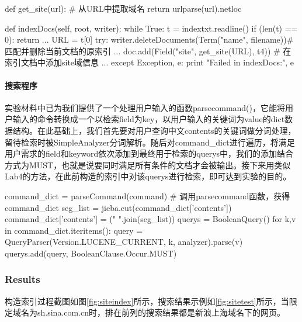 \documentclass{article}
\begin{document}
\begin{python}
def get_site(url):                                        # 从URL中提取域名
    return urlparse(url).netloc

def indexDocs(self, root, writer):
    while True:
        t = indextxt.readline()
        if (len(t) == 0):
            return
        ...
        URL = t[0]
        try:
            writer.deleteDocuments(Term("name", filename))# 匹配并删除当前文档的原索引
            ...
            doc.add(Field("site", get_site(URL), t4))     # 在索引文档中添加site域信息
            ...
        except Exception, e:
            print "Failed in indexDocs:", e
\end{python}

\paragraph{搜索程序}
实验材料中已为我们提供了一个处理用户输入的函数parsecommand()，它能将用户输入的命令转换成一个以检索field为key，以用户输入的关键词为value的dict数据结构。在此基础上，我们首先要对用户查询中文contents的关键词做分词处理，留待检索时被SimpleAnalyzer分词解析。随后对command\_dict进行遍历，将满足用户需求的field和keyword依次添加到最终用于检索的querys中，我们的添加结合方式为MUST，也就是说要同时满足所有条件的文档才会被输出。接下来用类似Lab4的方法，在此前构造的索引中对该querys进行检索，即可达到实验的目的。

\begin{python}
command_dict = parseCommand(command)                # 调用parsecommand函数，获得command_dict
seg_list = jieba.cut(command_dict['contents'])
command_dict['contents'] = (" ".join(seg_list))
querys = BooleanQuery()
for k,v in command_dict.iteritems():
    query = QueryParser(Version.LUCENE_CURRENT, k,
                        analyzer).parse(v)
    querys.add(query, BooleanClause.Occur.MUST)
\end{python}

\subsubsection{Results}

构造索引过程截图如图\ref{fig:siteindex}所示，搜索结果示例如\ref{fig:sitetest}所示，当限定域名为sh.sina.com.cn时，排在前列的搜索结果都是新浪上海域名下的网页。
\end{document}
